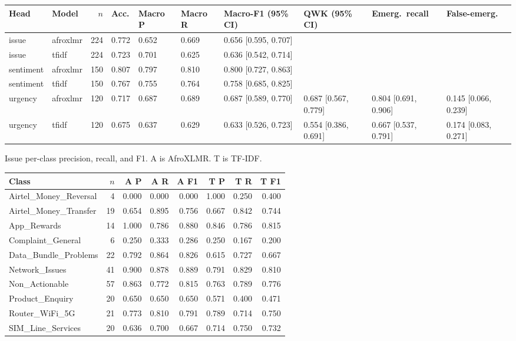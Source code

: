\documentclass[9pt,a4paper]{extarticle}
\begin{document}
{\scriptsize
\setlength{\tabcolsep}{2.2pt}
\begin{tabular}{@{}llrlllllll@{}}
\toprule
Head & Model & \(n\) & Acc. & Macro P & Macro R & Macro-F1 (95\% CI) & QWK (95\% CI) & Emerg.\ recall & False-emerg. \\
\midrule
issue & afroxlmr & 224 & 0.772 & 0.652 & 0.669 & 0.656 [0.595, 0.707] &  &  &  \\
issue & tfidf & 224 & 0.723 & 0.701 & 0.625 & 0.636 [0.542, 0.714] &  &  &  \\
sentiment & afroxlmr & 150 & 0.807 & 0.797 & 0.810 & 0.800 [0.727, 0.863] &  &  &  \\
sentiment & tfidf & 150 & 0.767 & 0.755 & 0.764 & 0.758 [0.685, 0.825] &  &  &  \\
urgency & afroxlmr & 120 & 0.717 & 0.687 & 0.689 & 0.687 [0.589, 0.770] & 0.687 [0.567, 0.779] & 0.804 [0.691, 0.906] & 0.145 [0.066, 0.239] \\
urgency & tfidf & 120 & 0.675 & 0.637 & 0.629 & 0.633 [0.526, 0.723] & 0.554 [0.386, 0.691] & 0.667 [0.537, 0.791] & 0.174 [0.083, 0.271] \\
\bottomrule
\end{tabular}

\vspace{0.3em}
Issue per-class precision, recall, and F1. A is AfroXLMR. T is TF-IDF.
\setlength{\tabcolsep}{3.2pt}
\begin{tabular}{@{}lrrrrrrr@{}}
\toprule
Class & \(n\) & A P & A R & A F1 & T P & T R & T F1 \\
\midrule
Airtel\_Money\_Reversal & 4 & 0.000 & 0.000 & 0.000 & 1.000 & 0.250 & 0.400 \\
Airtel\_Money\_Transfer & 19 & 0.654 & 0.895 & 0.756 & 0.667 & 0.842 & 0.744 \\
App\_Rewards & 14 & 1.000 & 0.786 & 0.880 & 0.846 & 0.786 & 0.815 \\
Complaint\_General & 6 & 0.250 & 0.333 & 0.286 & 0.250 & 0.167 & 0.200 \\
Data\_Bundle\_Problems & 22 & 0.792 & 0.864 & 0.826 & 0.615 & 0.727 & 0.667 \\
Network\_Issues & 41 & 0.900 & 0.878 & 0.889 & 0.791 & 0.829 & 0.810 \\
Non\_Actionable & 57 & 0.863 & 0.772 & 0.815 & 0.763 & 0.789 & 0.776 \\
Product\_Enquiry & 20 & 0.650 & 0.650 & 0.650 & 0.571 & 0.400 & 0.471 \\
Router\_WiFi\_5G & 21 & 0.773 & 0.810 & 0.791 & 0.789 & 0.714 & 0.750 \\
SIM\_Line\_Services & 20 & 0.636 & 0.700 & 0.667 & 0.714 & 0.750 & 0.732 \\
\bottomrule
\end{tabular}
}
\end{document}
